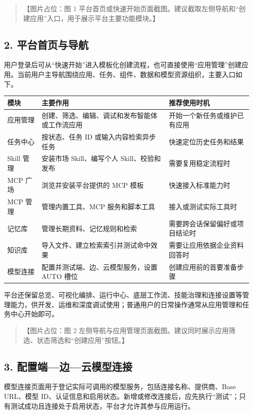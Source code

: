 \documentclass[UTF8,a4paper,12pt]{ctexart}
\begin{document}
\begin{quote}
【图片占位：图 1 平台首页或快速开始页面截图。建议截取左侧导航和``创建应用''入口，用于展示平台主要功能模块。】
\end{quote}

\subsection{2. 平台首页与导航}

用户登录后可从``快速开始''进入模板化创建流程，也可直接使用``应用管理''创建应用。当前用户主导航围绕应用、任务、组件、数据和模型资源组织，主要入口如下。

\begin{longtable}[]{@{}lll@{}}
\toprule
模块 & 主要作用 & 推荐使用时机 \\
\midrule
\endhead
应用管理 & 创建、筛选、编辑、调试和发布智能体或工作流应用 & 开始一个新任务或维护已有应用 \\
任务中心 & 按状态、任务 ID 或输入内容检索异步任务 & 快速定位历史任务和结果 \\
Skill 管理 & 安装市场 Skill、编写个人 Skill、校验和发布 & 需要复用稳定流程时 \\
MCP 广场 & 浏览并安装平台提供的 MCP 模板 & 快速接入标准能力时 \\
MCP 管理 & 管理内置工具、MCP 服务和脚本工具 & 接入或测试实际工具时 \\
记忆库 & 管理长期资料、记忆规则和检索 & 需要跨会话保留偏好或项目结论时 \\
知识库 & 导入文件、建立检索索引并测试命中效果 & 需要让应用依据企业资料回答时 \\
模型连接 & 配置并测试端、边、云模型服务，设置 AUTO 槽位 & 创建应用前的首要准备步骤 \\
\bottomrule
\end{longtable}

平台还保留总览、可视化编排、运行中心、底层工作流、技能治理和连接设置等管理能力，供开发、运维和深度调试使用；普通用户的日常操作通常从应用管理和任务中心开始即可。

\begin{quote}
【图片占位：图 2 左侧导航与应用管理页面截图。建议同时展示应用筛选、状态筛选和``创建应用''按钮。】
\end{quote}

\subsection{3. 配置端—边—云模型连接}

模型连接页面用于登记实际可调用的模型服务，包括连接名称、提供商、Base URL、模型 ID、认证信息和启用状态。新增或修改连接后，应先执行``测试''；只有测试成功且连接处于启用状态，平台才允许其参与应用运行。
\end{document}
